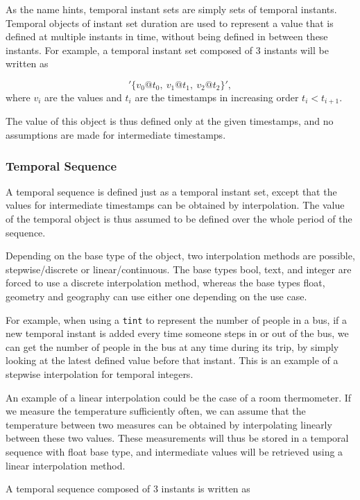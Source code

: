 As the name hints, temporal instant sets are simply sets of temporal instants. Temporal objects of instant set duration are used to represent a value that is defined at multiple instants in time, without being defined in between these instants. For example, a temporal instant set composed of 3 instants will be written as

\[
    '\{v_0@t_0,\ v_1@t_1,\ v_2@t_2\}',
\]
where \(v_i\) are the values and \(t_i\) are the timestamps in increasing order \(t_i < t_{i+1}\).

The value of this object is thus defined only at the given timestamps, and no assumptions are made for intermediate timestamps.

\subsubsection{Temporal Sequence}
\label{section:mobilitydb_seq}

A temporal sequence is defined just as a temporal instant set, except that the values for intermediate timestamps can be obtained by interpolation. The value of the temporal object is thus assumed to be defined over the whole period of the sequence.

Depending on the base type of the object, two interpolation methods are possible, stepwise/discrete or linear/continuous. The base types bool, text, and integer are forced to use a discrete interpolation method, whereas the base types float, geometry and geography can use either one depending on the use case.

For example, when using a \lstinline{tint} to represent the number of people in a bus, if a new temporal instant is added every time someone steps in or out of the bus, we can get the number of people in the bus at any time during its trip, by simply looking at the latest defined value before that instant. This is an example of a stepwise interpolation for temporal integers.

An example of a linear interpolation could be the case of a room thermometer. If we measure the temperature sufficiently often, we can assume that the temperature between two measures can be obtained by interpolating linearly between these two values. These measurements will thus be stored in a temporal sequence with float base type, and intermediate values will be retrieved using a linear interpolation method.

A temporal sequence composed of 3 instants is written as

